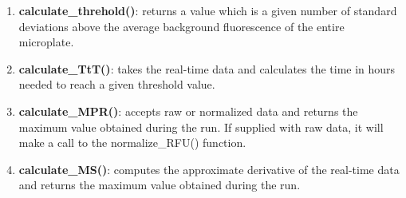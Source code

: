 \documentclass[preprint,12pt, a4paper]{elsarticle}
\begin{document}
        \begin{enumerate}
            \item \textbf{calculate\_threhold()}: returns a value which is a given number of standard deviations above the average background fluorescence of the entire microplate.

            \item \textbf{calculate\_TtT()}: takes the real-time data and calculates the time in hours needed to reach a given threshold value.


            \item \textbf{calculate\_MPR()}: accepts raw or normalized data and returns the maximum value obtained during the run. If supplied with raw data, it will make a call to the normalize\_RFU() function.

            \item \textbf{calculate\_MS()}: computes the approximate derivative of the real-time data and returns the maximum value obtained during the run.
        \end{enumerate}
\end{document}
